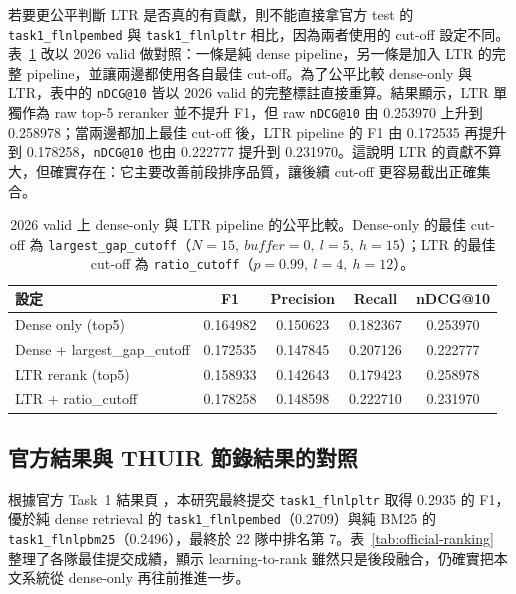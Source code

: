 若要更公平判斷 LTR 是否真的有貢獻，則不能直接拿官方 test 的 \texttt{task1\_flnlpembed} 與 \texttt{task1\_flnlpltr} 相比，因為兩者使用的 cut-off 設定不同。表~\ref{tab:ltr-contribution} 改以 2026 valid 做對照：一條是純 dense pipeline，另一條是加入 LTR 的完整 pipeline，並讓兩邊都使用各自最佳 cut-off。為了公平比較 dense-only 與 LTR，表中的 \texttt{nDCG@10} 皆以 2026 valid 的完整標註直接重算。結果顯示，LTR 單獨作為 raw top-5 reranker 並不提升 F1，但 raw \texttt{nDCG@10} 由 0.253970 上升到 0.258978；當兩邊都加上最佳 cut-off 後，LTR pipeline 的 F1 由 0.172535 再提升到 0.178258，\texttt{nDCG@10} 也由 0.222777 提升到 0.231970。這說明 LTR 的貢獻不算大，但確實存在：它主要改善前段排序品質，讓後續 cut-off 更容易截出正確集合。

\begin{table}[t]
  \centering
  \scriptsize
  \begin{tabular}{@{}p{}cccc@{}}
    \toprule
    設定 & F1 & Precision & Recall & nDCG@10 \\
    \midrule
    Dense only (top5) & 0.164982 & 0.150623 & 0.182367 & 0.253970 \\
    Dense + largest\_gap\_cutoff & 0.172535 & 0.147845 & 0.207126 & 0.222777 \\
    LTR rerank (top5) & 0.158933 & 0.142643 & 0.179423 & 0.258978 \\
    LTR + ratio\_cutoff & 0.178258 & 0.148598 & 0.222710 & 0.231970 \\
    \bottomrule
  \end{tabular}
  \caption{2026 valid 上 dense-only 與 LTR pipeline 的公平比較。Dense-only 的最佳 cut-off 為 \texttt{largest\_gap\_cutoff}（$N=15,\ buffer=0,\ l=5,\ h=15$）；LTR 的最佳 cut-off 為 \texttt{ratio\_cutoff}（$p=0.99,\ l=4,\ h=12$）。}
  \label{tab:ltr-contribution}
\end{table}

\clearpage

\subsection{官方結果與 THUIR 節錄結果的對照}

根據官方 Task~1 結果頁 \cite{coliee2026task1results}，本研究最終提交 \texttt{task1\_flnlpltr} 取得 0.2935 的 F1，優於純 dense retrieval 的 \texttt{task1\_flnlpembed}（0.2709）與純 BM25 的 \texttt{task1\_flnlpbm25}（0.2496），最終於 22 隊中排名第 7。表~\ref{tab:official-ranking} 整理了各隊最佳提交成績，顯示 learning-to-rank 雖然只是後段融合，仍確實把本文系統從 dense-only 再往前推進一步。

